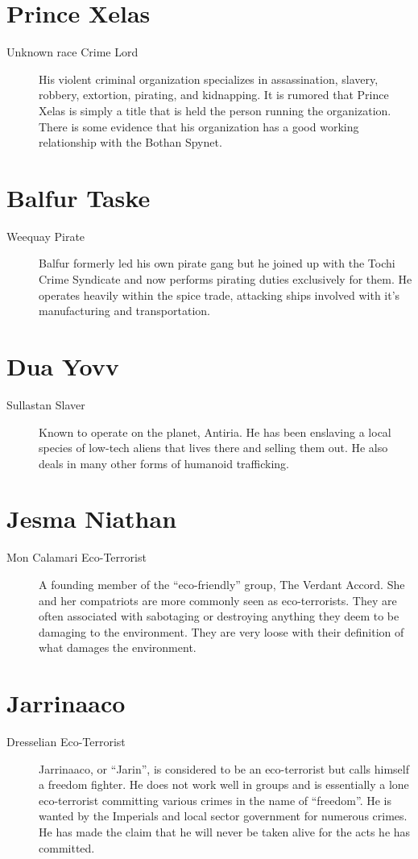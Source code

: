 \documentclass{article}
\begin{document}
\section{Prince Xelas}
\begin{description}
	\item [Unknown race \male Crime Lord] His violent criminal organization specializes in assassination, slavery, robbery, extortion, pirating, and kidnapping. It is rumored that Prince Xelas is simply a title that is held the person running the organization. There is some evidence that his organization has a good working relationship with the Bothan Spynet.
\end{description}
\section{Balfur Taske}
\begin{description}
	\item [Weequay \male Pirate] Balfur formerly led his own pirate gang but he joined up with the Tochi Crime Syndicate and now performs pirating duties exclusively for them. He operates heavily within the spice trade, attacking ships involved with it’s manufacturing and transportation.
\end{description}
\section{Dua Yovv}
\begin{description}
	\item [Sullastan \male Slaver] Known to operate on the planet, Antiria. He has been enslaving a local species of low-tech aliens that lives there and selling them out. He also deals in many other forms of humanoid trafficking.
\end{description}
\section{Jesma Niathan}
\begin{description}
	\item [Mon Calamari \female Eco-Terrorist] A founding member of the “eco-friendly” group, The Verdant Accord. She and her compatriots are more commonly seen as eco-terrorists. They are often associated with sabotaging or destroying anything they deem to be damaging to the environment. They are very loose with their definition of what damages the environment.
\end{description}
\section{Jarrinaaco}
\begin{description}
	\item [Dresselian \male Eco-Terrorist] Jarrinaaco, or “Jarin”, is considered to be an eco-terrorist but calls himself a freedom fighter. He does not work well in groups and is essentially a lone eco-terrorist committing various crimes in the name of “freedom”. He is wanted by the Imperials and local sector government for numerous crimes. He has made the claim that he will never be taken alive for the acts he has committed.
\end{description}
\end{document}

